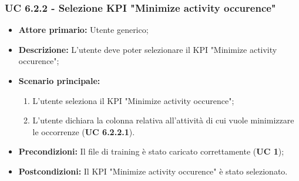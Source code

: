 \subsubsection{UC 6.2.2 - Selezione KPI "Minimize activity occurence"}
\begin{itemize}
	\item \textbf{Attore primario:} Utente generico;
	\item \textbf{Descrizione:} L'utente deve poter selezionare il KPI "Minimize activity occurence";
	\item \textbf{Scenario principale:}
		\begin{enumerate}
			\item L'utente seleziona il KPI "Minimize activity occurence";
			\item L'utente dichiara la colonna relativa all'attività di cui vuole minimizzare le occorrenze (\textbf{UC 6.2.2.1}).
		\end{enumerate}
			
	\item \textbf{Precondizioni:} Il file di training è stato caricato correttamente (\textbf{UC 1});
	\item \textbf{Postcondizioni:} Il KPI "Minimize activity occurence" è stato selezionato.
\end{itemize}

%			


